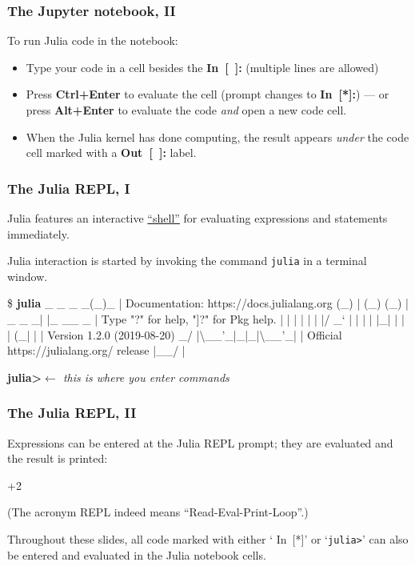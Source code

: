 \documentclass[english,serif,mathserif,xcolor=pdftex,dvipsnames,table]{beamer}
\begin{document}
\begin{frame}
  \frametitle{The Jupyter notebook, II}

  To run Julia code in the notebook:
  \begin{itemize}
  \item Type your code in a cell besides the {\ttfamily\bfseries\color{blue}
      In~[~]:} (multiple lines are allowed)
  \item Press \textbf{Ctrl+Enter} to evaluate the cell (prompt changes to
    {\ttfamily\bfseries\color{blue} In~[*]:}) --- or press \textbf{Alt+Enter} to
    evaluate the code \emph{and} open a new code cell.
  \item When the Julia kernel has done computing, the result appears \emph{under} the
    code cell marked with a {\ttfamily\bfseries\color{red} Out~[~]:} label.
  \end{itemize}

\end{frame}


\begin{frame}[fragile]
  \frametitle{The Julia REPL, I}
  Julia features an interactive
  \href{http://en.wikipedia.org/wiki/REPL}{``shell''} for evaluating
  expressions and statements immediately.

  \+
  Julia interaction is started by invoking the command
  \texttt{julia} in a terminal window.

  \+
\begin{semiverbatim}\tiny
\$ \textbf{julia}
               _
   _       _ _(_)_     |  Documentation: https://docs.julialang.org
  (_)     | (_) (_)    |
   _ _   _| |_  __ _   |  Type "?" for help, "]?" for Pkg help.
  | | | | | | |/ _` |  |
  | | |_| | | | (_| |  |  Version 1.2.0 (2019-08-20)
 _/ |{\textbackslash}__'_|_|_|{\textbackslash}__'_|  |  Official https://julialang.org/ release
|__/                   |

\textbf{julia>}{\color{blue}\normalfont\em \(\leftarrow\) this is where you enter commands}
\end{semiverbatim}
\end{frame}


\begin{frame}
  \frametitle{The Julia REPL, II}
  \smaller

  Expressions can be entered at the Julia REPL prompt; they are evaluated and the
  result is printed:
\begin{semiverbatim}
+2
\end{semiverbatim}

  \+
  (The acronym REPL indeed means ``Read-Eval-Print-Loop''.)

  \+ Throughout these slides, all code marked with either `{\color{blue}
    In~[*]}' or `\texttt{julia>}' can also be entered and evaluated in the Julia
  notebook cells.
\end{frame}
\end{document}
